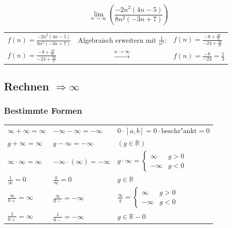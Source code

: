 \[
    \lim\limits_{n \to \infty}\left(\frac{-2n^2(4n-5)}{8n^2(-3n+7)}\right)
\]
\begin{tabular}{lcl}
    $ \displaystyle{f(n)= \frac{-2n^2(4n-5)}{8n^2(-3n+7)}}$                 & Algebraisch erweitern mit $\frac{1}{n^3}$: & $\displaystyle{f(n)=\frac{-8+\frac{10}{n}}{-24+\frac{56}{n}}}$\\
    $ \displaystyle{f(n)=\frac{-8+\frac{10}{n}}{-24+\frac{56}{n}}}$         & $\xrightarrow{n \to \infty}$               & $\displaystyle{f(n)=\frac{-8}{-24} = \frac{1}{3}}$ 
\end{tabular}


\subsection{Rechnen \texorpdfstring{$\Longrightarrow \infty$}{→ ∞}}

\subsubsection{Bestimmte Formen}

\renewcommand{\arraystretch}{2}
\begin{tabular}{lll}
    $\infty + \infty = \infty$      & $-\infty - \infty = -\infty$          & $0 \cdot [a,b] = 0 \cdot \text{beschr"ankt} = 0$  \\
    $g + \infty = \infty$           & $g - \infty = -\infty$                & 	$(g \in \mathbb{R})$                            \\
    $\infty \cdot \infty = \infty$  &	$-\infty \cdot (\infty) = -\infty$  &
    $g \cdot \infty =
    \begin{cases}
        \infty   & g > 0 \\ 
        -\infty & g < 0 
    \end{cases}$        \\ 		
    $\frac{1}{\infty} = 0$          &	$\frac{g}{\infty} = 0$              & 	$g \in \mathbb{R}$	                            \\
    $\frac{\infty}{0+} = \infty$	& $\frac{\infty}{0-} = -\infty$
    & $\frac{\infty}{g} =
    \begin{cases}			
        \infty & g > 0 \\
        -\infty & g < 0
    \end{cases} $ \\
    $\frac{1}{0+} = \infty$         & $\frac{1}{0-} = -\infty$	            & $g \in \mathbb{R} - {0}$                          \\
\end{tabular}


